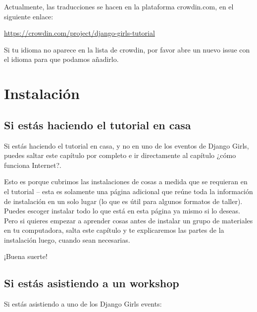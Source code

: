 \documentclass[
  a4paper,
  DIV=11,
  numbers=noendperiod,
  onepage,
  openany]{scrreprt}
\begin{document}
Actualmente, las traducciones se hacen en la plataforma crowdin.com, en
el siguiente enlace:

\url{https://crowdin.com/project/django-girls-tutorial}

Si tu idioma no aparece en la lista de crowdin, por favor abre un nuevo
issue con el idioma para que podamos añadirlo.

\part{Instalación}

\chapter{Si estás haciendo el tutorial en
casa}\label{si-estuxe1s-haciendo-el-tutorial-en-casa}

Si estás haciendo el tutorial en casa, y no en uno de los eventos de
Django Girls, puedes saltar este capítulo por completo e ir directamente
al capítulo ¿cómo funciona Internet?.

Esto es porque cubrimos las instalaciones de cosas a medida que se
requieran en el tutorial -- esta es solamente una página adicional que
reúne toda la información de instalación en un solo lugar (lo que es
útil para algunos formatos de taller). Puedes escoger instalar todo lo
que está en esta página ya mismo si lo deseas. Pero si quieres empezar a
aprender cosas antes de instalar un grupo de materiales en tu
computadora, salta este capítulo y te explicaremos las partes de la
instalación luego, cuando sean necesarias.

¡Buena suerte!

\chapter{Si estás asistiendo a un
workshop}\label{si-estuxe1s-asistiendo-a-un-workshop}

Si estás asistiendo a uno de los Django Girls events:
\end{document}
